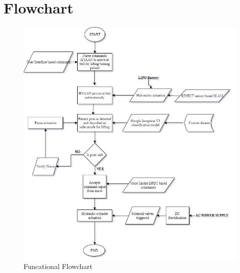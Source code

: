 \documentclass[12]{article}
\begin{document}
\section{Flowchart}

	\begin{figure}[hbt!]
		\centering
		\includegraphics[scale=0.5]{Flowchart.jpg}
		\caption{Funcational Flowchart}
		\label{image_1}
	\end{figure}
		
		
\end{document}
